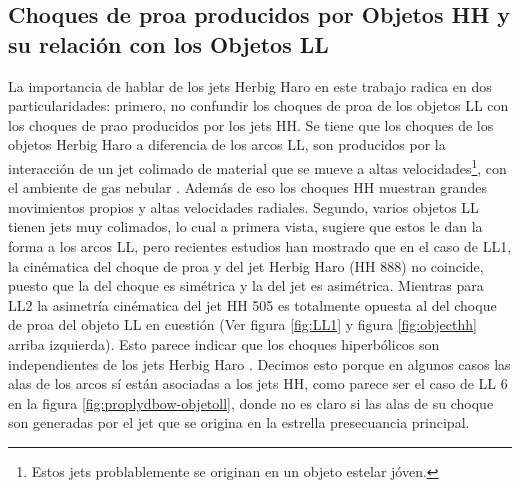 \subsection{Choques de proa producidos por Objetos HH y su relación con los Objetos LL}
\label{sec:herbig}

La importancia de hablar de los jets Herbig Haro en este trabajo radica en dos particularidades: primero, no confundir los choques de proa de los objetos LL con los choques de prao producidos por los jets HH. Se tiene que los choques de los objetos Herbig Haro a diferencia de los arcos LL, son producidos por la interacción de un jet colimado de material que se mueve a altas velocidades\footnote{Estos jets problablemente se originan en un objeto estelar jóven.}, con el ambiente de gas nebular \citep{Odell:1994}. Además de eso los choques HH muestran grandes movimientos propios y altas velocidades radiales. Segundo, varios objetos LL tienen jets muy colimados, lo cual a primera vista, sugiere que estos le dan la forma a los arcos LL, pero recientes estudios han mostrado que en el caso de LL1, la cinématica del choque de proa y del jet Herbig Haro (HH 888) no coincide, puesto que la del choque es simétrica y la del jet es asimétrica. Mientras para LL2 la asimetría cinématica del jet HH 505 es totalmente opuesta al del choque de proa del objeto LL en cuestión (Ver figura \ref{fig:LL1} y figura \ref{fig:objecthh} arriba izquierda). Esto parece indicar que los choques hiperbólicos son independientes de los jets Herbig Haro \citep{Henney:2013a}. Decimos esto porque en algunos casos las alas de los arcos sí están asociadas a los jets HH, como parece ser el caso de LL 6 en la figura \ref{fig:proplydbow-objetoll}, donde no es claro si las alas de su choque son generadas por el jet que se origina en la estrella presecuancia principal.

